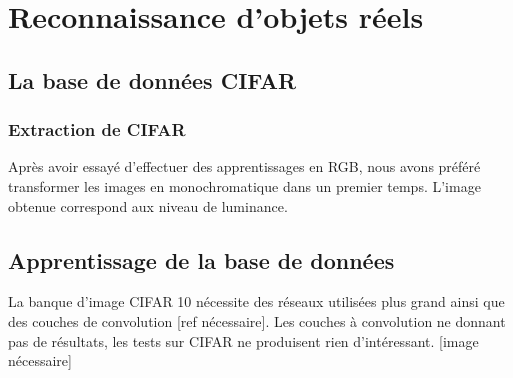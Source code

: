 \chapter{Reconnaissance d'objets réels}

\section{La base de données CIFAR}
\subsection{Extraction de CIFAR} 

Après avoir essayé d'effectuer des apprentissages en RGB, nous avons préféré transformer les images en monochromatique dans un premier temps. L'image obtenue correspond aux niveau de luminance.


\section{Apprentissage de la base de données}

La banque d'image CIFAR 10 nécessite des réseaux utilisées plus grand ainsi que des couches de convolution [ref nécessaire]. Les couches à convolution ne donnant pas de résultats, les tests sur CIFAR ne produisent rien d'intéressant.\label{CIFAR-remarque-convolution} [image nécessaire]